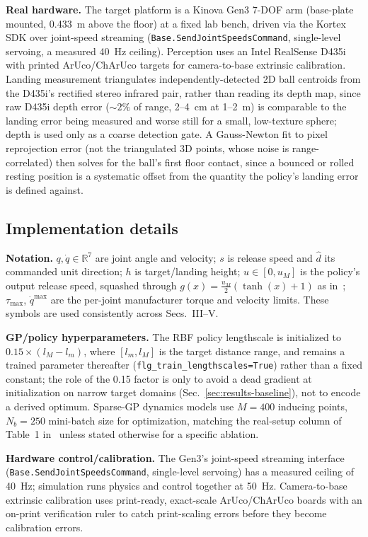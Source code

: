 \documentclass[conference]{IEEEtran}
\begin{document}
\textbf{Real hardware.} The target platform is a Kinova Gen3 7-DOF arm
(base-plate mounted, 0.433~m above the floor) at a fixed lab bench, driven
via the Kortex SDK over joint-speed streaming
(\texttt{Base.SendJointSpeedsCommand}, single-level servoing, a measured
40~Hz ceiling). Perception uses an Intel RealSense D435i with printed ArUco/ChArUco
targets for camera-to-base extrinsic calibration. Landing measurement
triangulates independently-detected 2D ball centroids from the D435i's
rectified stereo infrared pair, rather than reading its depth map, since
raw D435i depth error (${\sim}2\%$ of range, 2--4~cm at 1--2~m) is
comparable to the landing error being measured and worse still for a
small, low-texture sphere; depth is used only as a coarse detection gate.
A Gauss-Newton fit to pixel reprojection error (not the triangulated 3D
points, whose noise is range-correlated) then solves for the ball's first
floor contact, since a bounced or rolled resting position is a systematic
offset from the quantity the policy's landing error is defined against.

\subsection{Implementation details}
\label{sec:impl-details}
\textbf{Notation.} $q,\dot q \in \mathbb{R}^7$ are joint angle and
velocity; $s$ is release speed and $\hat d$ its commanded unit direction;
$h$ is target/landing height; $u \in [0, u_M]$ is the policy's output
release speed, squashed through $g(x) = \tfrac{u_M}{2}(\tanh(x)+1)$ as
in~\cite{turcato2025mcpilot}; $\tau_{\max}$, $\dot q^{\max}$ are the
per-joint manufacturer torque and velocity limits. These symbols are used
consistently across Secs.~III--V.

\textbf{GP/policy hyperparameters.} The RBF policy lengthscale is
initialized to $0.15\times(l_M - l_m)$, where $[l_m, l_M]$ is the target
distance range, and remains a trained parameter thereafter
(\texttt{flg\_train\_lengthscales=True}) rather than a fixed constant; the
role of the 0.15 factor is only to avoid a dead gradient at initialization
on narrow target domains (Sec.~\ref{sec:results-baseline}), not to encode a
derived optimum. Sparse-GP dynamics models use $M=400$ inducing points,
$N_b=250$ mini-batch size for optimization, matching the real-setup column
of Table~1 in~\cite{turcato2025mcpilot} unless stated otherwise for a
specific ablation.

\textbf{Hardware control/calibration.} The Gen3's joint-speed streaming
interface (\texttt{Base.SendJointSpeedsCommand}, single-level servoing) has
a measured ceiling of 40~Hz; simulation runs physics and control together
at 50~Hz. Camera-to-base extrinsic calibration uses print-ready,
exact-scale ArUco/ChArUco boards with an on-print verification ruler to
catch print-scaling errors before they become calibration errors.
\end{document}
